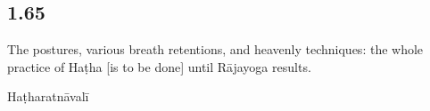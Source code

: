 \begin{ekdosis}
\subsection*{1.65}
\begin{translation}[hp01_065]
The postures, various breath retentions, and heavenly techniques: the whole practice of Haṭha [is to be done] until Rājayoga results. 
\end{translation}

\begin{sources}[hp01_065]
\end{sources}

\begin{testimonia}[hp01_065]
Haṭharatnāvalī

\begin{versinnote}
\end{versinnote}

\end{testimonia}

\begin{philcomm}[hp01_065]
\end{philcomm}

\end{ekdosis}

